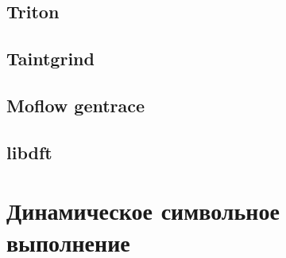 







\subsection{Triton}

\subsection{Taintgrind}

\subsection{Moflow gentrace}

\subsection{libdft}

\section{Динамическое символьное выполнение}


